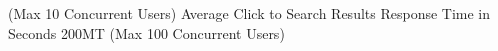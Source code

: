 (Max 10 Concurrent Users) Average Click to Search Results Response Time in Seconds 200MT (Max 100 Concurrent Users)
